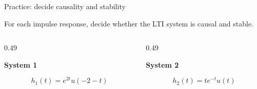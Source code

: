 \documentclass[aspectratio=169,11pt]{beamer}
\newcommand{\CardTitleSize}{\large}
\newcommand{\CardTitle}[1]{%
  \vspace{0.15cm}
  {\CardTitleSize\bfseries #1}\par
}
\begin{document}
\begin{frame}{Practice: decide causality and stability}

\begin{OrangeBox}[
  calloutshadedorange,
  fontupper=\large,
  halign=center
]{}
For each impulse response, decide whether the LTI system is causal and stable.
\end{OrangeBox}

\vspace{0.14cm}

\begin{columns}[c,totalwidth=\textwidth]

\begin{column}{0.49\textwidth}
\begin{GreenCard}[halign=center,top=14pt,bottom=14pt]
\CardTitle{System 1}

\vspace{0.10cm}

{\Large
\[
h_1(t)=e^{2t}u(-2-t)
\]
}



\end{GreenCard}
\end{column}

\begin{column}{0.49\textwidth}
\begin{BlueCard}[halign=center,top=14pt,bottom=14pt]
\CardTitle{System 2}

\vspace{0.10cm}

{\Large
\[
h_2(t)=t e^{-t}u(t)
\]
}



\end{BlueCard}
\end{column}

\end{columns}

\end{frame}
\end{document}
